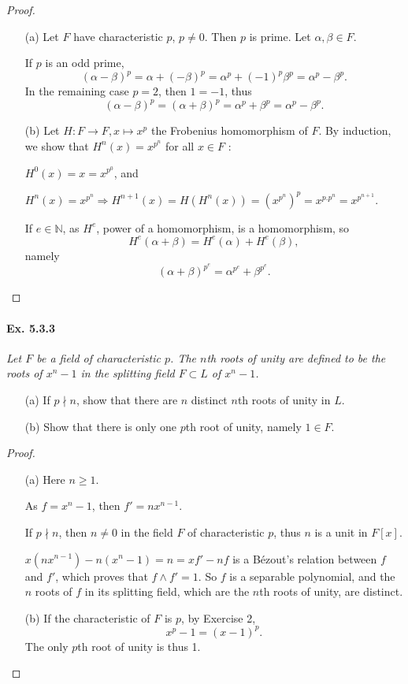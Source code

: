 \documentclass[11pt,a4paper]{article}
\newcommand{\N}{\mathbb{N}}
\begin{document}
\begin{proof}
\begin{enumerate}
\item[(a)]
Let $F$ have characteristic $p$, $p\neq 0$. Then $p$ is prime. Let $\alpha,\beta\in F$.

If  $p$ is an odd prime,
$$(\alpha- \beta)^p = \alpha+(-\beta)^p = \alpha^p +(-1)^p \beta^p = \alpha^p - \beta^p.$$
In the remaining case $p=2$, then  $1=-1$, thus
$$(\alpha- \beta)^p = (\alpha+ \beta)^p=\alpha^p + \beta^p=\alpha^p - \beta^p.$$

\item[(b)]
Let $H : F \to F, x \mapsto x^p$ the Frobenius homomorphism of $F$.
By induction, we show that $H^n (x) = x^{p^n}$ for all  $x\in F$ : 

$H^0(x) = x = x^{p^0}$, and 

$H^n(x) = x^{p^n} \Rightarrow H^{n+1}(x) = H(H^n(x)) = (x^{p^n})^p = x^{p.p^n} = x^{p^{n+1}}$.

If $e \in \N$, as $H^e$, power of a homomorphism, is a homomorphism, so $$H^e(\alpha+\beta) = H^e(\alpha)+H^e(\beta),$$ namely
$$(\alpha+\beta)^{p^e} = \alpha^{p^e}+\beta^{p^e}.$$
\end{enumerate}
\end{proof}

\paragraph{Ex. 5.3.3}

{\it Let $F$ be a field of characteristic $p$. The $n$th roots of unity are defined to be the roots of $x^n-1$ in the splitting field $F\subset L$ of $x^n-1$.
\begin{enumerate}
\item[(a)] If $p \nmid n$, show that there are $n$ distinct $n$th roots of unity in $L$.
\item[(b)] Show that there is only one $p$th root of unity, namely $1\in F$.
\end{enumerate}
}

\begin{proof}
\begin{enumerate}
\item[(a)] Here $n \geq 1$.

 As $f = x^n-1$, then $f'=nx^{n-1}$.
 
 If $p \nmid n$, then $n\neq 0$ in the field $F$ of characteristic $p$, thus $n$ is a unit in $F[x]$.
 
 $x(nx^{n-1}) - n(x^n-1) = n = xf'-nf$ is a B\'ezout's relation  between $f$ and $f'$, which proves that $f\wedge f'=1$. So $f$ is a separable polynomial, and the $n$ roots of $f$ in its splitting field, which are the $n$th roots of unity, are distinct.
 
 \item[(b)]
If the characteristic of $F$ is $p$, by Exercise 2,
 $$x^p-1 = (x-1)^p.$$
The only $p$th root of unity is thus 1.
 \end{enumerate}
\end{proof}
\end{document}

